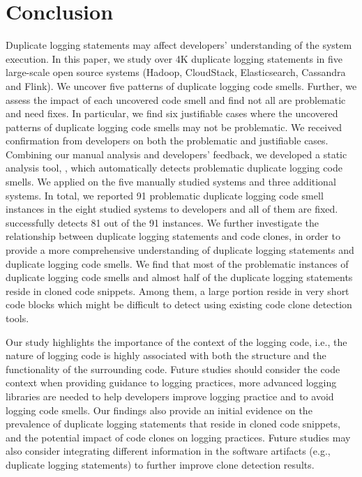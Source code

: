 \section{Conclusion}
\label{sec:conclusion}
Duplicate logging statements may affect developers' understanding of the system execution. In this paper, we study over 4K duplicate logging statements in five large-scale open source systems (Hadoop, CloudStack, Elasticsearch, Cassandra and Flink). We uncover five patterns of duplicate logging code smells. Further, we assess the impact of each uncovered code smell and find not all are problematic and need fixes. In particular, we find six justifiable cases where the uncovered patterns of duplicate logging code smells may not be problematic. We received confirmation from developers on both the problematic and justifiable cases.
Combining our manual analysis and developers' feedback, we developed a static analysis tool, \tool, which automatically detects problematic duplicate logging code smells.
We applied \toolS on the five manually studied systems and three additional systems. In total, we reported 91 problematic duplicate logging code smell instances in the eight studied systems to developers and all of them are fixed. \toolS successfully detects 81 out of the 91 instances.
We further investigate the relationship between duplicate logging statements and code clones, in order to provide a more comprehensive understanding of duplicate logging statements and duplicate logging code smells. We find that most of the problematic instances of duplicate logging code smells and almost half of the duplicate logging statements reside in cloned code snippets. Among them, a large portion reside in very short code blocks which might be difficult to detect using existing code clone detection tools.

Our study highlights the importance of the context of the logging code, i.e., the nature of logging code is highly associated with both the structure and the functionality of the surrounding code. Future studies should consider the code context when providing guidance to logging practices, more advanced logging libraries are needed to help developers improve logging practice and to avoid logging code smells. Our findings also provide an initial evidence on the prevalence of duplicate logging statements that reside in cloned code snippets, and the potential impact of code clones on logging practices. Future studies may also consider integrating different information in the software artifacts (e.g., duplicate logging statements) to further improve clone detection results.%



